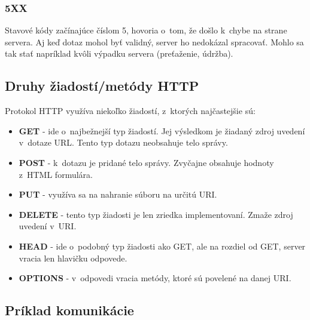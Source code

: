 \documentclass[slovak,cprint]{fitthesis} %
\begin{document}
\subsubsection{5XX}
Stavové kódy začínajúce číslom 5, hovoria o~tom, že došlo k~chybe na strane servera. Aj keď dotaz mohol byť validný, server ho nedokázal spracovať. Mohlo sa tak stať napríklad kvôli výpadku servera (preťaženie, údržba).

\subsection{Druhy žiadostí/metódy HTTP}
Protokol HTTP využíva niekoľko žiadostí, z~ktorých najčastejšie sú:
\begin{itemize}
    \item \textbf{GET} - ide o~najbežnejší typ žiadostí. Jej výsledkom je žiadaný zdroj uvedení v~dotaze URL. Tento typ dotazu neobsahuje telo správy.
    \item \textbf{POST} - k~dotazu je pridané telo správy. Zvyčajne obsahuje hodnoty z~HTML formulára.
    \item \textbf{PUT} - využíva sa na nahranie súboru na určitú URI.
    \item \textbf{DELETE} - tento typ žiadosti je len zriedka implementovaní. Zmaže zdroj uvedení v~URI.
    \item \textbf{HEAD} - ide o~podobný typ žiadosti ako GET, ale na rozdiel od GET, server vracia len hlavičku odpovede.
    \item \textbf{OPTIONS} - v~odpovedi vracia metódy, ktoré sú povelené na danej URI.
\end{itemize}




\newpage

\subsection{Príklad komunikácie}
\end{document}

